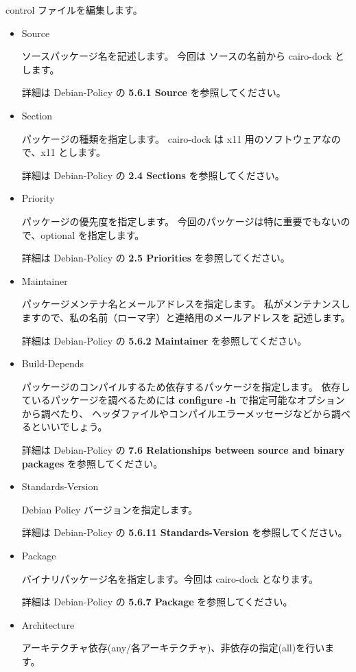 \documentclass[mingoth,a4paper]{jsarticle}
\begin{document}
\begin{enumerate}
		control ファイルを編集します。
	\begin{itemize}
		\item Source	

			ソースパッケージ名を記述します。
			今回は ソースの名前から cairo-dock とします。

			詳細は Debian-Policy の {\bf 5.6.1 Source} を参照してください。
		\item Section

			パッケージの種類を指定します。
			cairo-dock は x11 用のソフトウェアなので、x11 とします。

			詳細は Debian-Policy の {\bf 2.4 Sections} を参照してください。
		\item Priority
	
			パッケージの優先度を指定します。
			今回のパッケージは特に重要でもないので、optional を指定します。

			詳細は Debian-Policy の {\bf 2.5 Priorities} を参照してください。

		\item Maintainer

			パッケージメンテナ名とメールアドレスを指定します。
			私がメンテナンスしますので、私の名前（ローマ字）と連絡用のメールアドレスを
			記述します。

			詳細は Debian-Policy の {\bf 5.6.2 Maintainer} を参照してください。
			
		\item Build-Depends
			
			パッケージのコンパイルするため依存するパッケージを指定します。
			依存しているパッケージを調べるためには {\bf configure -h} で指定可能なオプションから調べたり、
			ヘッダファイルやコンパイルエラーメッセージなどから調べるといいでしょう。

			詳細は Debian-Policy の {\bf 7.6 Relationships between source and binary packages} を参照してください。
		\item Standards-Version

			Debian Policy バージョンを指定します。

			詳細は Debian-Policy の {\bf 5.6.11 Standards-Version} を参照してください。
		\item Package

			バイナリパッケージ名を指定します。今回は cairo-dock となります。

			詳細は Debian-Policy の {\bf 5.6.7 Package} を参照してください。
		\item Architecture

			アーキテクチャ依存(any/各アーキテクチャ)、非依存の指定(all)を行います。


\end{itemize}
\end{enumerate}
\end{document}
